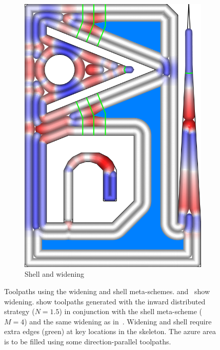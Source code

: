 {\begin{figure}
\begin{subfigure}[b]{\figwidth}
\includegraphics[width=\figwidth]{sources-validation-gMat_example_all_combined.png}
\caption{Shell and widening}
\label{shell}
\end{subfigure}
\caption{
Toolpaths using the widening and shell meta-schemes.
 and~ show widening.
show toolpaths generated with the inward distributed strategy ($N=1.5$) in conjunction with the shell meta-scheme ($M=4$) and the same widening as in~.
Widening and shell require extra edges (green) at key locations in the skeleton.
The azure area is to be filled using some direction-parallel toolpaths.
}
\label{widening_shell}
\end{figure}

}
















